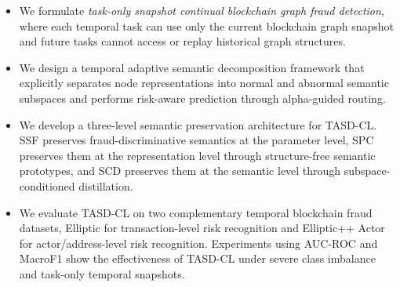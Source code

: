 \begin{itemize}
    \item We formulate \emph{task-only snapshot continual blockchain graph fraud detection}, where each temporal task can use only the current blockchain graph snapshot and future tasks cannot access or replay historical graph structures.

    \item We design a temporal adaptive semantic decomposition framework that explicitly separates node representations into normal and abnormal semantic subspaces and performs risk-aware prediction through alpha-guided routing.

    \item We develop a three-level semantic preservation architecture for TASD-CL. SSF preserves fraud-discriminative semantics at the parameter level, SPC preserves them at the representation level through structure-free semantic prototypes, and SCD preserves them at the semantic level through subspace-conditioned distillation.

    \item We evaluate TASD-CL on two complementary temporal blockchain fraud datasets, Elliptic for transaction-level risk recognition and Elliptic++ Actor for actor/address-level risk recognition. Experiments using AUC-ROC and MacroF1 show the effectiveness of TASD-CL under severe class imbalance and task-only temporal snapshots.
\end{itemize}